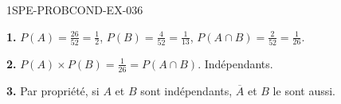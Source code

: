 \begin{corrige}{1SPE-PROBCOND-EX-036}

\textbf{1.} $P(A) = \frac{26}{52} = \frac{1}{2}$, $P(B) = \frac{4}{52} = \frac{1}{13}$, $P(A \cap B) = \frac{2}{52} = \frac{1}{26}$.

\textbf{2.} $P(A) \times P(B) = \frac{1}{26} = P(A \cap B)$. Indépendants.

\textbf{3.} Par propriété, si $A$ et $B$ sont indépendants, $\overline{A}$ et $B$ le sont aussi.

\end{corrige}
